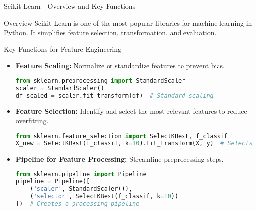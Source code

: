 \documentclass[aspectratio=169]{beamer}
\begin{document}
\begin{frame}[fragile]{Scikit-Learn - Overview and Key Functions}
    \begin{block}{Overview}
        Scikit-Learn is one of the most popular libraries for machine learning in Python. It simplifies feature selection, transformation, and evaluation.
    \end{block}

    \begin{block}{Key Functions for Feature Engineering}
        \begin{itemize}
            \item \textbf{Feature Scaling:} Normalize or standardize features to prevent bias.
            \begin{lstlisting}[language=Python]
from sklearn.preprocessing import StandardScaler
scaler = StandardScaler()
df_scaled = scaler.fit_transform(df)  # Standard scaling
            \end{lstlisting}

            \item \textbf{Feature Selection:} Identify and select the most relevant features to reduce overfitting.
            \begin{lstlisting}[language=Python]
from sklearn.feature_selection import SelectKBest, f_classif
X_new = SelectKBest(f_classif, k=10).fit_transform(X, y)  # Selects top k features
            \end{lstlisting}

            \item \textbf{Pipeline for Feature Processing:} Streamline preprocessing steps.
            \begin{lstlisting}[language=Python]
from sklearn.pipeline import Pipeline
pipeline = Pipeline([
    ('scaler', StandardScaler()),
    ('selector', SelectKBest(f_classif, k=10))
])  # Creates a processing pipeline
            \end{lstlisting}
        \end{itemize}
    \end{block}
\end{frame}
\end{document}
